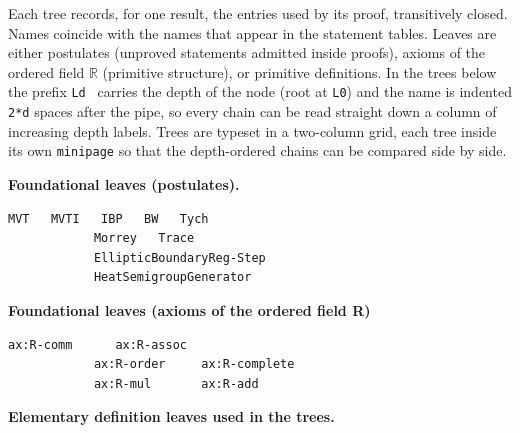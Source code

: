 \documentclass[11pt,reqno]{amsart}
\providecommand{\R}{\mathbb{R}}
\begin{document}
	\label{sec:scripts}
	
	\noindent Each tree records, for one result, the entries used by its proof,
	transitively closed. Names coincide with the names that appear in the
	statement tables. Leaves are either postulates (unproved statements admitted
	inside proofs), axioms of the ordered field $\R$ (primitive structure), or
	primitive definitions. In the trees below the prefix \verb|Ld | carries the
	depth of the node (root at \verb|L0|) and the name is indented \verb|2*d|
	spaces after the pipe, so every chain can be read straight down a column of
	increasing depth labels. Trees are typeset in a two-column grid, each tree
	inside its own \verb|minipage| so that the depth-ordered chains can be
	compared side by side.
	\noindent \text{ \ } \newline
	\medskip \noindent%
	\begin{minipage}[t]{\linewidth}
		\vspace{0pt}
		
		\noindent\begin{minipage}[t]{0.48\linewidth}
			\vspace{0pt}
			\textbf{Foundational leaves (postulates).}
			
			\smallskip
			
			\begin{Verbatim}[frame=single,framerule=0.7pt,
			rulecolor=\color{blue!60!black},framesep=8pt,
			fontsize=\scriptsize,xleftmargin=6pt,xrightmargin=6pt]
			MVT   MVTI   IBP   BW   Tych
			Morrey   Trace
			EllipticBoundaryReg-Step
			HeatSemigroupGenerator
			\end{Verbatim}
		\end{minipage}\hfill
		\begin{minipage}[t]{0.55\linewidth}
			\vspace{0pt}
			\textbf{Foundational leaves (axioms of the ordered field R)}
			
			\smallskip
			
			\begin{Verbatim}[frame=single,framerule=0.7pt,
			rulecolor=\color{blue!60!black},framesep=8pt,
			fontsize=\scriptsize,xleftmargin=6pt,xrightmargin=6pt]
			ax:R-comm      ax:R-assoc
			ax:R-order     ax:R-complete
			ax:R-mul       ax:R-add
			\end{Verbatim}
		\end{minipage}
		\medskip
		
		\noindent\textbf{Elementary definition leaves used in the trees.}
		

\end{minipage}
\end{document}
